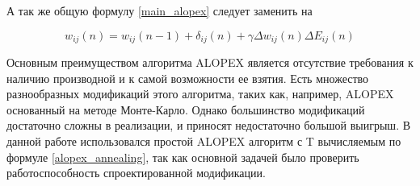 \documentclass[utf8,usehyperref,14pt]{G7-32}
\begin{document}
А так же общую формулу \eqref{main_alopex} следует заменить на 

\begin{equation}
w_{ij}(n) = w_{ij}(n-1) + \delta_{ij}(n) + \gamma \Delta w_{ij}(n) \Delta E_{ij}(n)
\end{equation}

Основным преимуществом алгоритма ALOPEX является отсутствие требования к наличию производной и к самой возможности ее взятия. Есть множество разнообразных модификаций этого алгоритма, таких как, например, ALOPEX основанный на методе Монте-Карло\cite{carlo_alopex}. Однако большинство модификаций достаточно сложны в реализации, и приносят недостаточно большой выигрыш. В данной работе использовался простой ALOPEX алгоритм с T вычисляемым по формуле \eqref{alopex_annealing}, так как основной задачей было проверить работоспособность спроектированной модификации.
\end{document}

